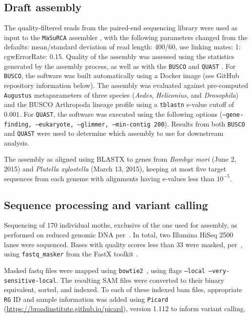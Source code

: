 \documentclass[smallextended]{svjour3}
\begin{document}
\subsection*{Draft assembly}

The quality-filtered reads from the paired-end sequencing library were used as
input to
the \texttt{MaSuRCA} assembler \citep[][versions 2.3.2, 3.1.3]{Zimin:2013kn},
with the
following parameters changed from the defaults: mean/standard deviation of read
length: 400/60, use linking mates: 1: cgwErrorRate: 0.15.  Quality of the
assembly was assessed using the statistics generated by the assembly process,
as
well as with the \texttt{BUSCO} \citep[][version 1.1b1]{Simao:2015kk} and
\texttt{QUAST} \citep[][version 3.2]{Gurevich:2013je}. For \texttt{BUSCO}, the
software was built automatically using a Docker image (see GitHub repository
information below). The assembly was evaluated against pre-computed
\texttt{Augustus} \citep{Stanke:2003eo} metaparameters of three species
(\textit{Aedes}, \textit{Heliconius}, and \textit{Drosophila}) and the BUSCO
Arthropoda lineage profile using a \texttt{tblastn} e-value cutoff of $0.001$.
For \texttt{QUAST}, the software was executed using the following options
(\texttt{--gene-finding, --eukaryote, --glimmer, --min-contig 200}).  Results
from both \texttt{BUSCO} and \texttt{QUAST} were used to determine which
assembly to use for downstream analysis.

The assembly as aligned using BLASTX \citep[][version 2.2.30+]{Camacho:2009fc}
to genes from \textit{Bombyx mori} (June 2, 2015) and  \textit{Plutella
xylostella} (March 13, 2015), keeping at most five target sequences from each
geneme with alignments having e-values less than $10^{-5}$.

\subsection*{Sequence processing and variant calling} Sequencing of 170
individual moths, exclusive of the one used for assembly,  as performed on
reduced genomic DNA per~\cite{PARCHMAN:2012ca}. In total, two Illumina HiSeq
2500 lanes were sequenced. Bases with quality scores less than 33 were masked,
per~\cite{Yun:2014dn},  using \texttt{fastq\_masker} from the FastX toolkit
\citep[][version 0.0.14]{citeulike:9103573}.

Masked fastq files were mapped using \texttt{bowtie2}~\citep[][version
2.2.4]{Langmead:2012jh}, using flags  \texttt{--local --very-sensitive-local}.
The resulting  SAM files were converted to their binary equivalent, sorted,
and indexed. To each of these indexed bam files, appropriate \texttt{RG} ID and
sample information was added using \texttt{Picard}
(\url{https://broadinstitute.github.io/picard}), version 1.112 to inform
variant
calling.
\end{document}
